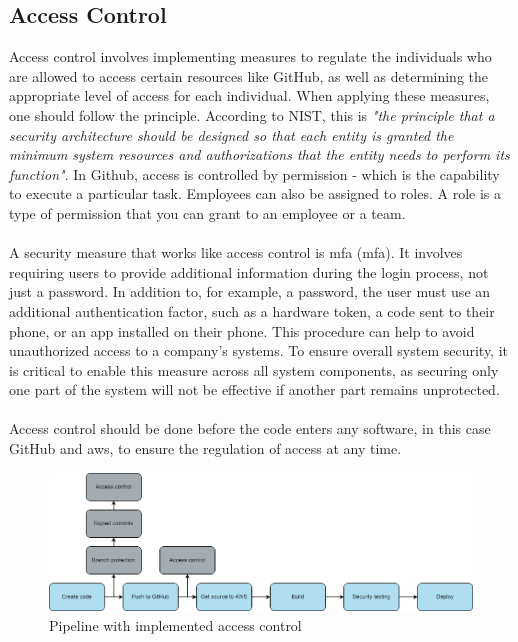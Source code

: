 \subsection{Access Control}
Access control involves implementing measures to regulate the individuals who are allowed to access certain resources like GitHub, as well as determining the appropriate level of access for each individual. When applying these measures, one should follow the  principle. According to NIST, this is \textit{"the principle that a security architecture should be designed so that each entity is granted the minimum system resources and authorizations that the entity needs to perform its function"}\cite{leastprivilege}. In Github, access is controlled by permission - which is the capability to execute a particular task. Employees can also be assigned to roles. A role is a type of permission that you can grant to an employee or a team. \cite{accesscontroll}
\\~\\
A security measure that works like access control is \acrlong{mfa} (\acrshort{mfa}). It involves requiring users to provide additional information during the login process, not just a password. In addition to, for example, a password, the user must use an additional authentication factor, such as a hardware token, a code sent to their phone, or an app installed on their phone. This procedure can help to avoid unauthorized access to a company's systems. To ensure overall system security, it is critical to enable this measure across all system components, as securing only one part of the system will not be effective if another part remains unprotected. \cite{MFA}
\\~\\
Access control should be done before the code enters any software, in this case GitHub and \acrshort{aws}, to ensure the regulation of access at any time.

\vspace{2mm}
\begin{figure}[H]
    \centering
    \includegraphics[width=0.8\columnwidth]{Images/pipeline7.png}
    \caption{Pipeline with implemented access control}
    \label{fig: Pipeline with implemented access control}
\end{figure}
 
